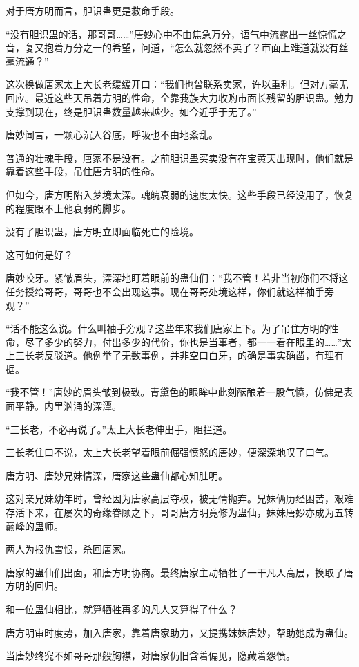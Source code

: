 \begin{this_body}
对于唐方明而言，胆识蛊更是救命手段。

“没有胆识蛊的话，那哥哥……”唐妙心中不由焦急万分，语气中流露出一丝惊慌之音，复又抱着万分之一的希望，问道，“怎么就忽然不卖了？市面上难道就没有丝毫流通？”

这次换做唐家太上大长老缓缓开口：“我们也曾联系卖家，许以重利。但对方毫无回应。最近这些天吊着方明的性命，全靠我族大力收购市面长残留的胆识蛊。勉力支撑到现在，终是胆识蛊数量越来越少。如今近乎于无了。”

唐妙闻言，一颗心沉入谷底，呼吸也不由地紊乱。

普通的壮魂手段，唐家不是没有。之前胆识蛊买卖没有在宝黄天出现时，他们就是靠着这些手段，吊住唐方明的性命。

但如今，唐方明陷入梦境太深。魂魄衰弱的速度太快。这些手段已经没用了，恢复的程度跟不上他衰弱的脚步。

没有了胆识蛊，唐方明立即面临死亡的险境。

这可如何是好？

唐妙咬牙。紧皱眉头，深深地盯着眼前的蛊仙们：“我不管！若非当初你们不将这任务授给哥哥，哥哥也不会出现这事。现在哥哥处境这样，你们就这样袖手旁观？”

“话不能这么说。什么叫袖手旁观？这些年来我们唐家上下。为了吊住方明的性命，尽了多少的努力，付出多少的代价，你也是当事者，都一一看在眼里的……”太上三长老反驳道。他例举了无数事例，并非空口白牙，的确是事实确凿，有理有据。

“我不管！”唐妙的眉头皱到极致。青黛色的眼眸中此刻酝酿着一股气愤，仿佛是表面平静。内里汹涌的深潭。

“三长老，不必再说了。”太上大长老伸出手，阻拦道。

三长老住口不说，太上大长老望着眼前倔强愤怒的唐妙，便深深地叹了口气。

唐方明、唐妙兄妹情深，唐家这些蛊仙都心知肚明。

这对亲兄妹幼年时，曾经因为唐家高层夺权，被无情抛弃。兄妹俩历经困苦，艰难存活下来，在屡次的奇缘眷顾之下，哥哥唐方明竟修为蛊仙，妹妹唐妙亦成为五转巅峰的蛊师。

两人为报仇雪恨，杀回唐家。

唐家的蛊仙们出面，和唐方明协商。最终唐家主动牺牲了一干凡人高层，换取了唐方明的回归。

和一位蛊仙相比，就算牺牲再多的凡人又算得了什么？

唐方明审时度势，加入唐家，靠着唐家助力，又提携妹妹唐妙，帮助她成为蛊仙。

当唐妙终究不如哥哥那般胸襟，对唐家仍旧含着偏见，隐藏着怨愤。


\end{this_body}
